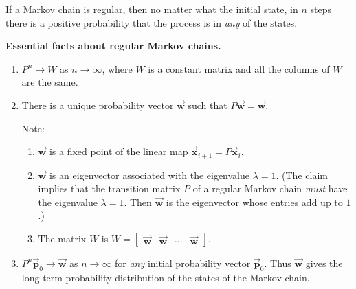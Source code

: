 \documentclass[reqno]{immbook}
\newcommand{\BP}{\vec{\textbf{p}}}
\newcommand{\BW}{\vec{\textbf{w}}}
\newcommand{\BX}{\vec{\textbf{x}}}
\numberwithin{equation}{chapter}
\numberwithin{question}{section}
\numberwithin{theorem}{chapter}
\numberwithin{figure}{chapter}
\theoremstyle{definition}
\begin{document}
\medskip
If a Markov chain is regular, then no matter what the
initial state, in $n$ steps there is a positive
probability that the process is in \emph{any} of the states.

\noindent
\textbf{Essential facts about regular Markov chains.}
\begin{enumerate}
\item
$P^n\rightarrow W$ as $n\rightarrow\infty$, where
$W$ is a constant matrix and all the columns of
$W$ are the same.
\item There is a unique probability vector
$\BW$ such that $P\BW = \BW$.

Note:
\begin{enumerate}
\item $\BW$ is a fixed point of the linear map $\BX_{i+1} = P\BX_i$.
\item $\BW$ is an eigenvector associated with the eigenvalue $\lambda=1$.
(The claim implies that the transition matrix $P$ of a regular
Markov chain \emph{must} have the eigenvalue $\lambda=1$.
Then $\BW$ is the eigenvector whose entries add up to $1$.)
\item The matrix $W$ is $W = \begin{bmatrix} \BW & \BW & \cdots & \BW\end{bmatrix}$.
\end{enumerate}
\item $P^n\BP_0 \rightarrow \BW$ as $n\rightarrow\infty$ for \emph{any}
initial probability vector $\BP_0$.
Thus $\BW$ gives the long-term probability distribution of the
states of the Markov chain.
\end{enumerate}
\end{document}
